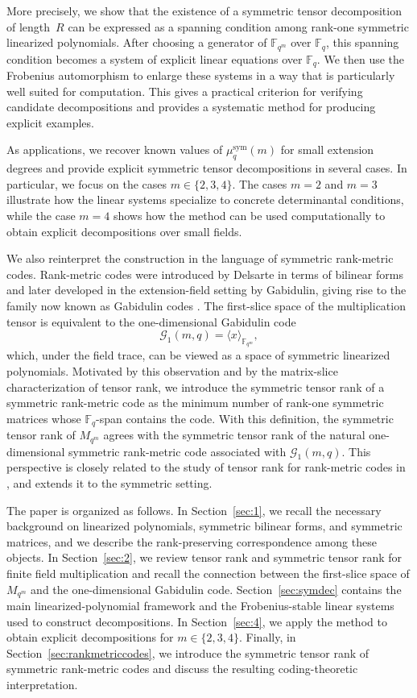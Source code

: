 \documentclass[11pt,a4paper,reqno]{article}
\numberwithin{equation}{section}
\theoremstyle{definition}
\begin{document}
More precisely, we show that the existence of a symmetric tensor
decomposition of length~\(R\) can be expressed as a spanning condition among
rank-one symmetric linearized polynomials. After choosing a generator of
\(\mathbb F_{q^m}\) over \(\mathbb F_q\), this spanning condition becomes a
system of explicit linear equations over \(\mathbb F_q\). We then use the
Frobenius automorphism to enlarge these systems in a way that is particularly
well suited for computation. This gives a practical criterion for verifying
candidate decompositions and provides a systematic method for producing
explicit examples.

As applications, we recover known values of \(\mu_q^{\mathrm{sym}}(m)\) for
small extension degrees and provide explicit symmetric tensor decompositions
in several cases. In particular, we focus on the cases \(m\in\{2,3,4\}\).
The cases \(m=2\) and \(m=3\) illustrate how the linear systems specialize
to concrete determinantal conditions, while the case \(m=4\) shows how the
method can be used computationally to obtain explicit decompositions over
small fields.

We also reinterpret the construction in the language of symmetric
rank-metric codes. Rank-metric codes were introduced by Delsarte in terms of
bilinear forms and later developed in the extension-field setting by
Gabidulin, giving rise to the family now known as Gabidulin codes
\cite{delsarte1978bilinear,gabidulin1985theory}. The first-slice space of
the multiplication tensor is equivalent to the one-dimensional Gabidulin code
\[
\mathcal{G}_1(m,q)=\langle x\rangle_{\mathbb F_{q^m}},
\]
which, under the field trace, can be viewed as a space of symmetric
linearized polynomials. Motivated by this observation and by the
matrix-slice characterization of tensor rank, we introduce the symmetric
tensor rank of a symmetric rank-metric code as the minimum number of
rank-one symmetric matrices whose \(\mathbb F_q\)-span contains the code.
With this definition, the symmetric tensor rank of \(M_{q^m}\) agrees with
the symmetric tensor rank of the natural one-dimensional symmetric
rank-metric code associated with \(\mathcal{G}_1(m,q)\). This perspective is
closely related to the study of tensor rank for rank-metric codes in
\cite{byrne2023tensor,byrne2019tensor}, and extends it to the symmetric
setting.

The paper is organized as follows. In Section~\ref{sec:1}, we recall the
necessary background on linearized polynomials, symmetric bilinear forms,
and symmetric matrices, and we describe the rank-preserving correspondence
among these objects. In Section~\ref{sec:2}, we review tensor rank and
symmetric tensor rank for finite field multiplication and recall the
connection between the first-slice space of \(M_{q^m}\) and the
one-dimensional Gabidulin code. Section~\ref{sec:symdec} contains the main
linearized-polynomial framework and the Frobenius-stable linear systems used
to construct decompositions. In Section~\ref{sec:4}, we apply the method to obtain explicit decompositions for \(m\in\{2,3,4\}\). Finally, in
Section~\ref{sec:rankmetriccodes}, we introduce the symmetric tensor rank of
symmetric rank-metric codes and discuss the resulting coding-theoretic
interpretation.
\end{document}

